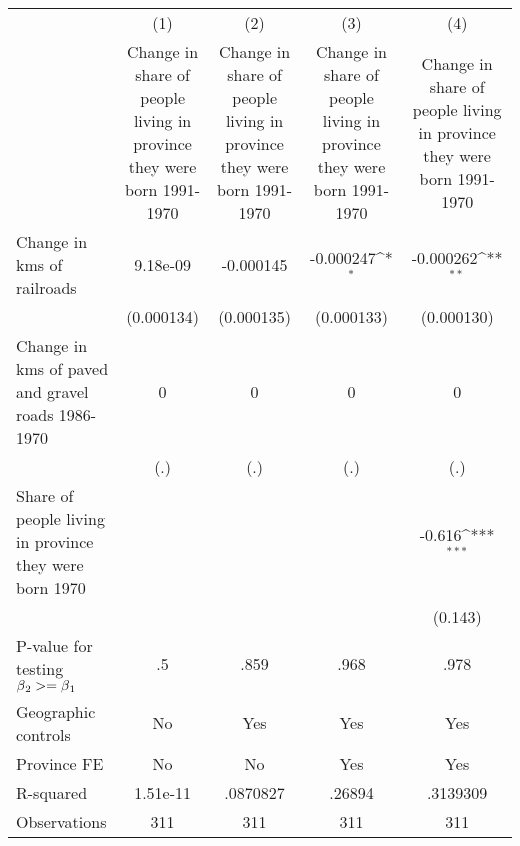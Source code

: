 {
\def\sym#1{\ifmmode^{#1}\else\(^{#1}\)\fi}
\begin{tabular}{l*{4}{c}}
\hline\hline
                &\multicolumn{1}{c}{(1)}&\multicolumn{1}{c}{(2)}&\multicolumn{1}{c}{(3)}&\multicolumn{1}{c}{(4)}\\
                &\multicolumn{1}{c}{Change in share of people living in province they were born 1991-1970}&\multicolumn{1}{c}{Change in share of people living in province they were born 1991-1970}&\multicolumn{1}{c}{Change in share of people living in province they were born 1991-1970}&\multicolumn{1}{c}{Change in share of people living in province they were born 1991-1970}\\
\hline
Change in kms of railroads& 9.18e-09         &-0.000145         &-0.000247\sym{*}  &-0.000262\sym{**} \\
                &(0.000134)         &(0.000135)         &(0.000133)         &(0.000130)         \\
[1em]
Change in kms of paved and gravel roads 1986-1970&        0         &        0         &        0         &        0         \\
                &      (.)         &      (.)         &      (.)         &      (.)         \\
[1em]
Share of people living in province they were born 1970&                  &                  &                  &   -0.616\sym{***}\\
                &                  &                  &                  &  (0.143)         \\
\hline
P-value for testing $\beta\\_2 >= \beta\\_1$&       .5         &     .859         &     .968         &     .978         \\
Geographic controls&       No         &      Yes         &      Yes         &      Yes         \\
Province FE     &       No         &       No         &      Yes         &      Yes         \\
R-squared       & 1.51e-11         & .0870827         &   .26894         & .3139309         \\
Observations    &      311         &      311         &      311         &      311         \\
\hline\hline
\end{tabular}
}
